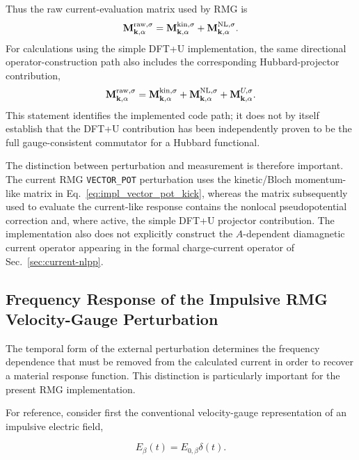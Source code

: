Thus the raw current-evaluation matrix used by RMG is
\begin{equation}
  \mathbf M_{\mathbf k,\alpha}^{\rm raw,\sigma}
  =
  \mathbf M_{\mathbf k,\alpha}^{\rm kin,\sigma}
  +
  \mathbf M_{\mathbf k,\alpha}^{\rm NL,\sigma}.
  \label{eq:impl_mraw}
\end{equation}
For calculations using the simple DFT+U implementation, the same
directional operator-construction path also includes the corresponding
Hubbard-projector contribution,
\begin{equation}
  \mathbf M_{\mathbf k,\alpha}^{\rm raw,\sigma}
  =
  \mathbf M_{\mathbf k,\alpha}^{\rm kin,\sigma}
  +
  \mathbf M_{\mathbf k,\alpha}^{\rm NL,\sigma}
  +
  \mathbf M_{\mathbf k,\alpha}^{U,\sigma}.
  \label{eq:impl_mraw_ldau}
\end{equation}
This statement identifies the implemented code path; it does not by
itself establish that the DFT+U contribution has been independently
proven to be the full gauge-consistent commutator for a Hubbard
functional.

The distinction between perturbation and measurement is therefore
important.  The current RMG \texttt{VECTOR\_POT} perturbation uses the
kinetic/Bloch momentum-like matrix in
Eq.~\eqref{eq:impl_vector_pot_kick}, whereas the matrix subsequently
used to evaluate the current-like response contains the nonlocal
pseudopotential correction and, where active, the simple DFT+U
projector contribution.  The implementation also does not explicitly
construct the $A$-dependent diamagnetic current operator appearing in
the formal charge-current operator of Sec.~\ref{sec:current-nlpp}.

\subsection{Frequency Response of the Impulsive RMG Velocity-Gauge Perturbation}
\label{sec:rmg_vg_frequency_response}

The temporal form of the external perturbation determines the frequency
dependence that must be removed from the calculated current in order to
recover a material response function.  This distinction is particularly
important for the present RMG implementation.

For reference, consider first the conventional velocity-gauge
representation of an impulsive electric field,

\begin{equation}
E_{\beta}(t)=E_{0,\beta}\delta(t).
\label{eq:standard_e_delta}
\end{equation}

